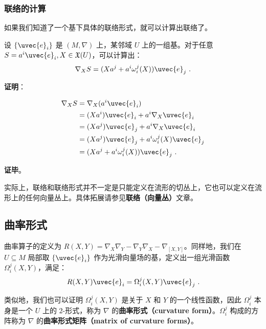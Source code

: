 \subsubsection{联络的计算}

如果我们知道了一个基下具体的联络形式，就可以计算出联络了。

\begin{theorem}{}
设 $\{\uvec{e}_i\}$ 是 $(M, \nabla)$ 上，某邻域 $U$ 上的一组基。对于任意 $S=a^i\uvec{e}_i, X\in\mathfrak{X}(U)$，可以计算出：
\begin{equation}
\nabla_XS=(Xa^j+a^i\omega^j_i(X))\uvec{e}_j~.
\end{equation}
\end{theorem}

\textbf{证明}：

\begin{equation}
\begin{aligned}
\nabla_XS&=\nabla_X(a^i\uvec{e}_i)\\
&=(Xa^i)\uvec{e}_i+a^i\nabla_X\uvec{e}_i\\
&=(Xa^j)\uvec{e}_j+a^i\nabla_X\uvec{e}_i\\
&=(Xa^j)\uvec{e}_j+a^i\omega^j_i(X)\uvec{e}_j\\
&=(Xa^j+a^i\omega^j_i(X))\uvec{e}_j~.
\end{aligned}
\end{equation}

\textbf{证毕}。

实际上，联络和联络形式并不一定是只能定义在流形的切丛上，它也可以定义在流形上的任何向量丛上。具体拓展请参见\textbf{联络（向量丛）}文章。

\subsection{曲率形式}

曲率算子的定义为 $R(X, Y)=\nabla_X\nabla_Y-\nabla_Y\nabla_X-\nabla_{[X, Y]}$。同样地，我们在 $U\subseteq M$ 局部取 $\{\uvec{e}_i\}$ 作为光滑向量场的基，定义出一组光滑函数 $\Omega^j_i(X, Y)$，满足：
\begin{equation}
R(X, Y)\uvec{e}_i=\Omega^j_i(X, Y)\uvec{e}_j~.
\end{equation}

类似地，我们也可以证明 $\Omega^j_i(X, Y)$ 是关于 $X$ 和 $Y$ 的一个线性函数，因此 $\Omega^j_i$ 本身是一个 $U$ 上的 $2$-形式，称为 $\nabla$ 的\textbf{曲率形式（curvature form）}。$\Omega^j_i$ 构成的方阵称为 $\nabla$ 的\textbf{曲率形式矩阵（matrix of curvature forms）}。

